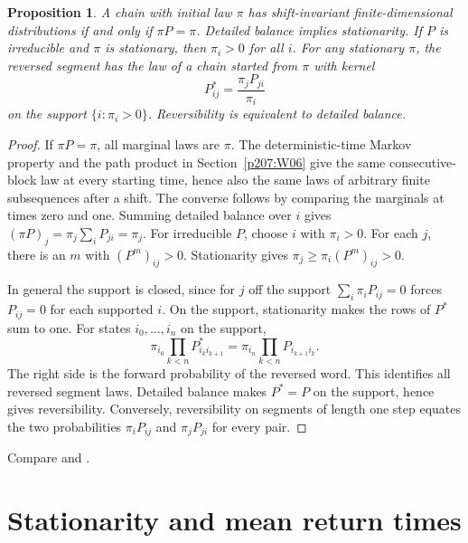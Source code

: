 \documentclass[11pt,oneside,openany]{book}
\theoremstyle{plain}
\newtheorem{proposition}[theorem]{Proposition}
\theoremstyle{definition}
\theoremstyle{remark}
\begin{document}
\begin{proposition}
A chain with initial law \(\pi\) has shift-invariant finite-dimensional
distributions if and only if \(\pi P=\pi\).
Detailed balance implies stationarity.
If \(P\) is irreducible and \(\pi\) is stationary, then \(\pi_i>0\)
for all \(i\).
For any stationary \(\pi\), the reversed segment has the law of a
chain started from \(\pi\) with kernel
\[
 P^*_{ij}=\frac{\pi_jP_{ji}}{\pi_i}
\]
on the support \(\{i:\pi_i>0\}\). Reversibility is equivalent to
detailed balance.
\end{proposition}
\begin{proof}
If \(\pi P=\pi\), all marginal laws are \(\pi\).
The deterministic-time Markov property and the path product
in Section~\ref{p207:W06} give the same consecutive-block law
at every starting time, hence also the same laws of arbitrary
finite subsequences after a shift. The converse follows by comparing
the marginals at times zero and one. Summing detailed balance over
\(i\) gives \((\pi P)_j=\pi_j\sum_iP_{ji}=\pi_j\).
For irreducible \(P\), choose \(i\) with \(\pi_i>0\).
For each \(j\), there is an \(m\) with \((P^m)_{ij}>0\).
Stationarity gives \(\pi_j\ge\pi_i(P^m)_{ij}>0\).

In general the support is closed, since for \(j\) off the support
\(\sum_i\pi_iP_{ij}=0\) forces \(P_{ij}=0\) for each supported \(i\).
On the support, stationarity makes the rows of \(P^*\) sum to one.
For states \(i_0,\ldots,i_n\) on the support,
\[
 \pi_{i_0}\prod_{k<n}P^*_{i_k i_{k+1}}
 =\pi_{i_n}\prod_{k<n}P_{i_{k+1}i_k}.
\]
The right side is the forward probability of the reversed word.
This identifies all reversed segment laws. Detailed balance makes
\(P^*=P\) on the support, hence gives reversibility. Conversely,
reversibility on segments of length one step equates the two
probabilities \(\pi_iP_{ij}\) and \(\pi_jP_{ji}\) for every pair.
\end{proof}

Compare \cite[Sections 1.7 and 1.9]{Norris}
and \cite[Section 5.5]{Durrett}.

\section{Stationarity and mean return times}
\label{p207:W14}
\end{document}
